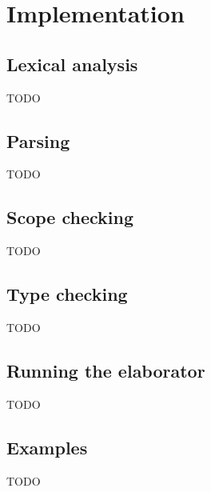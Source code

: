 \chapter{Implementation}
\label{ch:Implementation}

\section{Lexical analysis}

TODO

\section{Parsing}

TODO

\section{Scope checking}

TODO

\section{Type checking}

TODO

\section{Running the elaborator}

TODO

\section{Examples}

TODO
